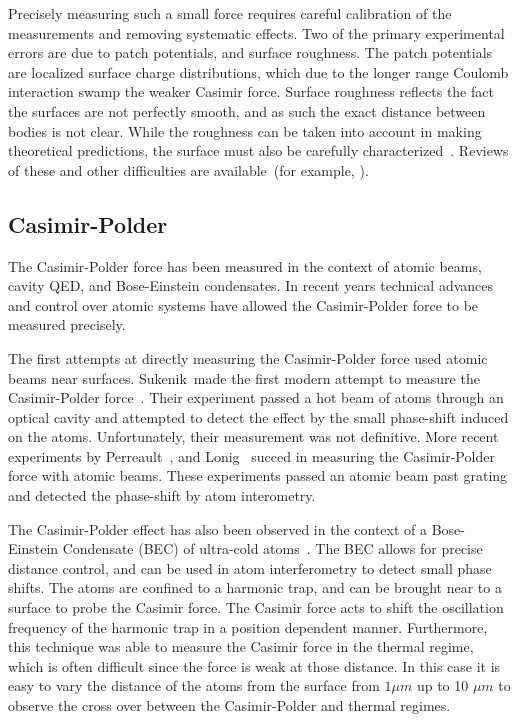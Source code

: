 Precisely measuring such a small force requires careful calibration of the measurements 
and removing systematic effects.  Two of the primary experimental errors are due to 
patch potentials, and surface roughness.  The patch potentials are localized surface 
charge distributions, which due to the longer range Coulomb interaction swamp the weaker
Casimir force.  Surface roughness reflects the fact the surfaces are not perfectly smooth,
and as such the exact distance between bodies is not clear.  While the roughness can be taken into
account in making theoretical predictions, the surface must also be carefully characterized~\cite{vanZwol2011}.
  Reviews of these and other 
difficulties are available~(for example, \cite{Dalvit2011}).

\subsection{Casimir-Polder}
The Casimir-Polder force has been measured in the context of atomic beams, cavity QED, and 
Bose-Einstein condensates.  
In recent years technical advances and control over atomic systems have allowed the Casimir-Polder
force to be measured precisely.  

The first attempts at directly measuring the Casimir-Polder force used atomic beams 
near surfaces.  
Sukenik~\etal made the first modern attempt to measure the Casimir-Polder force~\cite{Sukenik1993}.
Their experiment passed a hot beam of atoms through an optical cavity and attempted to detect
the effect by the small phase-shift induced on the atoms.  Unfortunately, their measurement 
was not definitive.
More recent experiments by Perreault~\etal\cite{Perreault2005}, and Lonig~\etal\cite{Lonij2009} succed in measuring
the Casimir-Polder force with atomic beams.  These experiments passed an atomic beam past grating and 
detected the phase-shift by atom interometry.  %

The Casimir-Polder effect has also been observed in the context of a Bose-Einstein Condensate (BEC)
of ultra-cold atoms~\cite{Harber2005,Obrecht2007}.  The BEC allows for precise distance control,
and can be used in atom interferometry to detect small phase shifts.    
The atoms are confined to a harmonic trap, and can be brought near to a surface to probe the Casimir
force.  The Casimir force acts to shift the oscillation frequency of the harmonic trap in a position
dependent manner.  
Furthermore, this technique was able to measure the Casimir force in the thermal regime, which
is often difficult since the force is weak at those distance.  In this case it is easy to 
vary the distance of the atoms from the surface from $1\mu m$ up to 10 $\mu m$ to observe
the cross over between the Casimir-Polder and thermal regimes.

